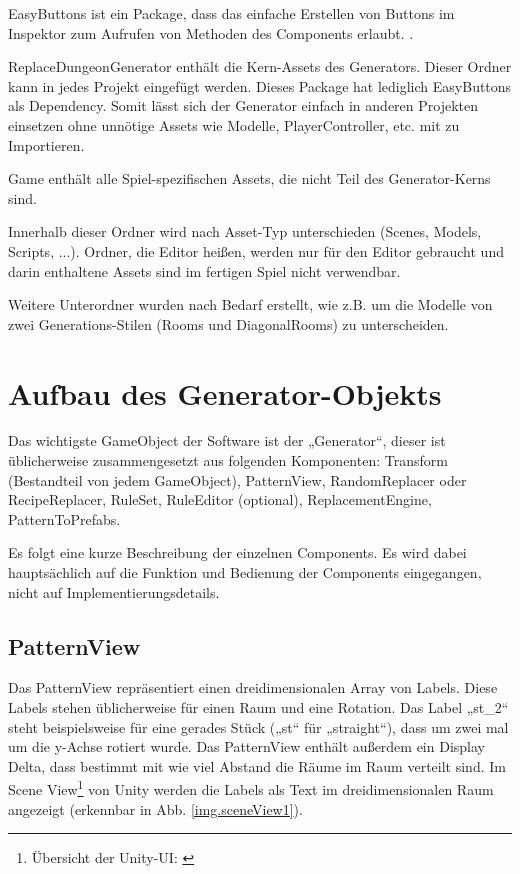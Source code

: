 EasyButtons ist ein Package, dass das einfache Erstellen von Buttons im Inspektor zum Aufrufen von Methoden des Components erlaubt. .

ReplaceDungeonGenerator enthält die Kern-Assets des Generators. Dieser Ordner kann in jedes Projekt eingefügt werden. Dieses Package hat lediglich EasyButtons als Dependency. Somit lässt sich der Generator einfach in anderen Projekten einsetzen ohne unnötige Assets wie Modelle, PlayerController, etc. mit zu Importieren.

Game enthält alle Spiel-spezifischen Assets, die nicht Teil des Generator-Kerns sind.

Innerhalb dieser Ordner wird nach Asset-Typ unterschieden (Scenes, Models, Scripts, ...). Ordner, die Editor heißen, werden nur für den Editor gebraucht und darin enthaltene Assets sind im fertigen Spiel nicht verwendbar.

Weitere Unterordner wurden nach Bedarf erstellt, wie z.B. um die Modelle von zwei Generations-Stilen (Rooms und DiagonalRooms) zu unterscheiden.

\section{Aufbau des Generator-Objekts}

Das wichtigste GameObject der Software ist der „Generator“, dieser ist üblicherweise zusammengesetzt aus folgenden Komponenten: 
Transform (Bestandteil von jedem GameObject), PatternView, RandomReplacer oder RecipeReplacer, RuleSet, RuleEditor (optional), ReplacementEngine, PatternToPrefabs. 


Es folgt eine kurze Beschreibung der einzelnen Components. Es wird dabei hauptsächlich auf die Funktion und Bedienung der Components eingegangen, nicht auf Implementierungsdetails.

\subsection{PatternView}\label{ss.patternView}

Das PatternView repräsentiert einen dreidimensionalen Array von Labels. Diese Labels stehen üblicherweise für einen Raum und eine Rotation. Das Label „st\_2“ steht beispielsweise für eine gerades Stück („st“ für „straight“), dass um zwei mal um die y-Achse rotiert wurde. Das PatternView enthält außerdem ein Display Delta, dass bestimmt mit wie viel Abstand die Räume im Raum verteilt sind. Im Scene View\footnote{Übersicht der Unity-UI: \cite[Seite: LearningtheInterface]{unityManual}} von Unity werden die Labels als Text im dreidimensionalen Raum angezeigt (erkennbar in Abb. \ref{img.sceneView1}).

